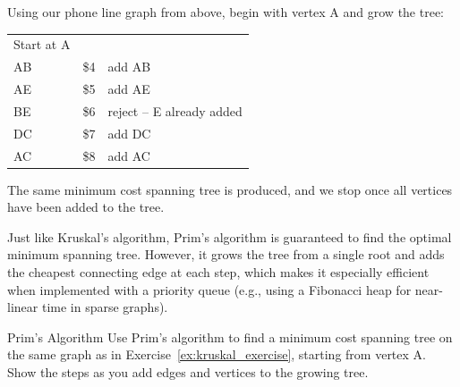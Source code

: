 \begin{example}{} %
Using our phone line graph from above, begin with vertex A and grow the tree:\\
\begin{minipage}{.5\textwidth}
\begin{tabular}{lll}
Start at A&&\\
AB&	\$4&	add AB\\
AE	&\$5	&add AE\\
BE	&\$6&	reject -- E already added\\
DC	&\$7&	add DC\\
AC&\$8&	add AC\\
\end{tabular}
\end{minipage}
%
\begin{minipage}{.5\textwidth}
\end{minipage}

The same minimum cost spanning tree is produced, and we stop once all vertices have been added to the tree.
\end{example}

Just like Kruskal's algorithm, Prim’s algorithm is guaranteed to find the optimal minimum spanning tree. However, it grows the tree from a single root and adds the cheapest connecting edge at each step, which makes it especially efficient when implemented with a priority queue (e.g., using a Fibonacci heap for near-linear time in sparse graphs).

\begin{ex}{Prim's Algorithm}{}\label{ex:prim_exercise}
Use Prim's algorithm to find a minimum cost spanning tree on the same graph as in Exercise~\ref{ex:kruskal_exercise}, starting from vertex A. Show the steps as you add edges and vertices to the growing tree.
\end{ex}

